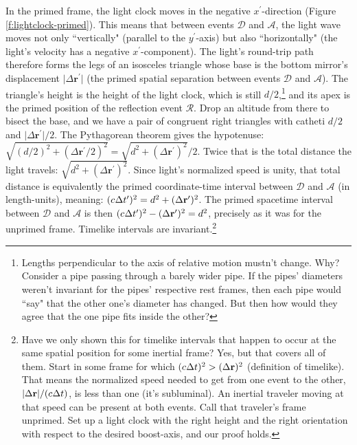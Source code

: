 \documentclass[12pt]{article}
\renewcommand{\vv}[1]{\mathbf{#1}}
\begin{document}
In the primed frame, the light clock moves in the negative $x^{\prime}$-direction (Figure \ref{f:lightclock-primed}). This means that between events $\mathcal{D}$ and $\mathcal{A}$, the light wave moves not only ``vertically" (parallel to the $y^{\prime}$-axis) but also ``horizontally" (the light's velocity has a negative $x^{\prime}$-component). The light's round-trip path therefore forms the legs of an isosceles triangle whose base is the bottom mirror's displacement $\vert \Delta \vv r^{\prime} \vert$ (the primed spatial separation between events $\mathcal{D}$ and $\mathcal{A}$). The triangle's height is the height of the light clock, which is still $d/2$,\footnote{\label{fn:lengthcontraction}Lengths perpendicular to the axis of relative motion mustn't change. Why? Consider a pipe passing through a barely wider pipe. If the pipes' diameters weren't invariant for the pipes' respective rest frames, then each pipe would ``say" that the other one's diameter has changed. But then how would they agree that the one pipe fits inside the other?} and its apex is the primed position of the reflection event $\mathcal{R}$. Drop an altitude from there to bisect the base, and we have a pair of congruent right triangles with catheti $d/2$ and $\vert \Delta \vv r^{\prime} \vert / 2$. The Pythagorean theorem gives the hypotenuse: $\sqrt{(d/2)^2 + (\Delta \vv r^{\prime} / 2)^2} = \sqrt{d^2 + (\Delta \vv r^{\prime})^2} / 2$. Twice that is the total distance the light travels: $\sqrt{d^2 + (\Delta \vv r^{\prime})^2}$. Since light's normalized speed is unity, that total distance is equivalently the primed coordinate-time interval between $\mathcal{D}$ and $\mathcal{A}$ (in length-units), meaning:  ${(c \mkern.5mu \Delta t^{\prime})^2 = d^2 + (\Delta \vv r^{\prime})^2}$. The primed spacetime interval between $\mathcal{D}$ and $\mathcal{A}$ is then $(c \mkern.5mu \Delta t^{\prime})^2 - (\Delta \vv r^{\prime})^2 = d^2$, precisely as it was for the unprimed frame. Timelike intervals are invariant.\footnote{Have we only shown this for timelike intervals that happen to occur at the same spatial position for some inertial frame? Yes, but that covers all of them. Start in some frame for which $(c \mkern.5mu \Delta t)^2 > ( \Delta \vv r )^2$ (definition of timelike). That means the normalized speed needed to get from one event to the other, $\vert \Delta \vv r \vert / (c \mkern.5mu \Delta t)$, is less than one (it's subluminal). An inertial traveler moving at that speed can be present at both events. Call that traveler's frame unprimed. Set up a light clock with the right height and the right orientation with respect to the desired boost-axis, and our proof holds.}
\end{document}
